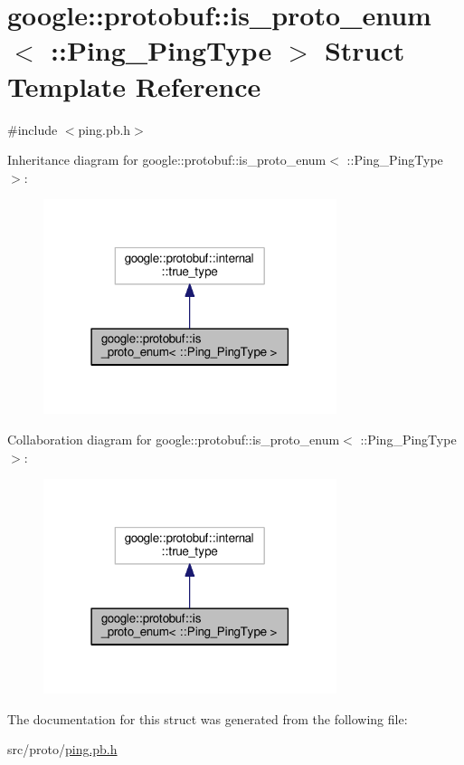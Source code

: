 \hypertarget{structgoogle_1_1protobuf_1_1is__proto__enum_3_01_1_1_ping___ping_type_01_4}{}\section{google\+:\+:protobuf\+:\+:is\+\_\+proto\+\_\+enum$<$ \+:\+:Ping\+\_\+\+Ping\+Type $>$ Struct Template Reference}
\label{structgoogle_1_1protobuf_1_1is__proto__enum_3_01_1_1_ping___ping_type_01_4}


{\ttfamily \#include $<$ping.\+pb.\+h$>$}



Inheritance diagram for google\+:\+:protobuf\+:\+:is\+\_\+proto\+\_\+enum$<$ \+:\+:Ping\+\_\+\+Ping\+Type $>$\+:
\nopagebreak
\begin{figure}[H]
\begin{center}
\leavevmode
\includegraphics[width=243pt]{structgoogle_1_1protobuf_1_1is__proto__enum_3_01_1_1_ping___ping_type_01_4__inherit__graph}
\end{center}
\end{figure}


Collaboration diagram for google\+:\+:protobuf\+:\+:is\+\_\+proto\+\_\+enum$<$ \+:\+:Ping\+\_\+\+Ping\+Type $>$\+:
\nopagebreak
\begin{figure}[H]
\begin{center}
\leavevmode
\includegraphics[width=243pt]{structgoogle_1_1protobuf_1_1is__proto__enum_3_01_1_1_ping___ping_type_01_4__coll__graph}
\end{center}
\end{figure}


The documentation for this struct was generated from the following file\+:\begin{DoxyCompactItemize}
\item 
src/proto/\hyperlink{ping_8pb_8h}{ping.\+pb.\+h}\end{DoxyCompactItemize}
